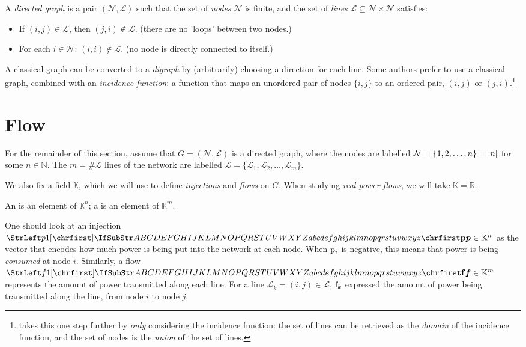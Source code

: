 \documentclass[main.tex]{subfiles}
\begin{document}
\begin{definition}
A \emph{directed graph} is a pair $(\mathcal{N},\mathcal{L})$ such that the set of \emph{nodes} $\mathcal{N}$ is finite, and the set of \emph{lines} $\mathcal{L}\subseteq \mathcal{N} \times \mathcal{N}$ satisfies:
\begin{itemize}
    \item If $(i,j) \in \mathcal{L}$, then $(j,i) \notin \mathcal{L}$. (\ie there are no 'loops' between two nodes.)
    \item For each $i \in \mathcal{N}$: $(i,i) \notin \mathcal{L}$. (\ie no node is directly connected to itself.)
\end{itemize}
\end{definition}

A classical graph can be converted to a \emph{digraph} by (arbitrarily) choosing a direction for each line. Some authors prefer to use a classical graph, combined with an \emph{incidence function}: a function that maps an unordered pair of nodes $\{i,j\}$ to an ordered pair, $(i,j)$ or $(j,i)$.\footnote{\cite{Slepian1968} takes this one step further by \emph{only} considering the incidence function: the set of lines can be retrieved as the \emph{domain} of the incidence function, and the set of nodes is the \emph{union} of the set of lines.}

\section{Flow}
For the remainder of this section, assume that $G=(\mathcal{N},\mathcal{L})$ is a directed graph, where the nodes are labelled $\mathcal{N}=\{1,2,\dots,n\}=[n]$ for some $n \in \mathbb{N}$.
The $m = \# \mathcal{L}$ lines of the network are labelled $\mathcal{L}=\{\mathcal{L}_1,\mathcal{L}_2,\dots,\mathcal{L}_m\}$.

We also fix a field $\mathbb{K}$, which we will use to define \emph{injections} and \emph{flows} on $G$. When studying \emph{real power flows}, we will take $\mathbb{K}=\mathbb{R}$.

\begin{definition}\label{def:injectionandflow}
An  is an element of $\mathbb{K}^n$; a  is an element of $\mathbb{K}^m$.
\end{definition}

One should look at an injection $\mat{p} \in \mathbb{K}^n$ as the vector that encodes how much power is being put into the network at each node. When ${\mathrm{p}}_i$ is negative, this means that power is being \emph{consumed} at node $i$. Similarly, a flow $\mat{f} \in \mathbb{K}^m$ represents the amount of power transmitted along each line. For a line $\mathcal{L}_k=(i,j) \in \mathcal{L}$, ${\mathrm{f}}_k$ expressed the amount of power being transmitted along the line, from node $i$ to node $j$.
\end{document}
